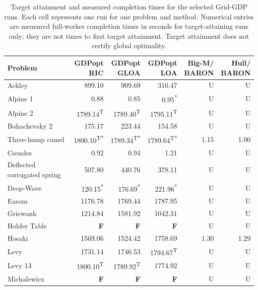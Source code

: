 \documentclass{article}
\begin{document}
\begin{table}[htbp]
\centering
\caption{Target attainment and measured completion times for the selected Grid-GDP runs. Each cell represents one run for one problem and method. Numerical entries are measured full-worker completion times in seconds for target-attaining runs only; they are not times to first target attainment. Target attainment does not certify global optimality.}
\label{tab:grid-gdp-outcomes}
\small
\setlength{\tabcolsep}{4pt}
\renewcommand{\arraystretch}{1.13}
\begin{tabular}{@{}lrrrrr@{}}
\toprule
Problem & \shortstack{GDPopt\\RIC} & \shortstack{GDPopt\\GLOA} & \shortstack{GDPopt\\LOA} & \shortstack{Big-M/\\BARON} & \shortstack{Hull/\\BARON} \\
\midrule
Ackley & 899.10 & 909.69 & 310.47 & U & U \\
Alpine 1 & 0.88 & 0.85 & 0.95\textsuperscript{*} & U & U \\
Alpine 2 & 1789.14\textsuperscript{T} & 1789.40\textsuperscript{T} & 1795.11\textsuperscript{T} & U & U \\
Bohachevsky 2 & 175.17 & 223.44 & 154.58 & U & U \\
Three-hump camel & 1800.10\textsuperscript{T*} & 1789.34\textsuperscript{T*} & 1789.64\textsuperscript{T*} & 1.15 & 1.00 \\
Csendes & 0.92 & 0.94 & 1.21 & U & U \\
Deflected corrugated spring & 507.80 & 440.76 & 378.11 & U & U \\
Drop-Wave & 120.15\textsuperscript{*} & 176.69\textsuperscript{*} & 221.96\textsuperscript{*} & U & U \\
Easom & 1176.78 & 1769.44 & 1787.95 & U & U \\
Griewank & 1214.84 & 1581.92 & 1042.31 & U & U \\
Holder Table & \textbf{F} & \textbf{F} & \textbf{F} & U & U \\
Hosaki & 1569.06 & 1524.42 & 1758.69 & 1.30 & 1.29 \\
Levy & 1731.14 & 1746.53 & 1794.67\textsuperscript{T} & U & U \\
Levy 13 & 1800.10\textsuperscript{T} & 1789.92\textsuperscript{T} & 1774.92 & U & U \\
Michalewicz & \textbf{F} & \textbf{F} & \textbf{F} & U & U \\

\end{tabular}
\end{table}
\end{document}
